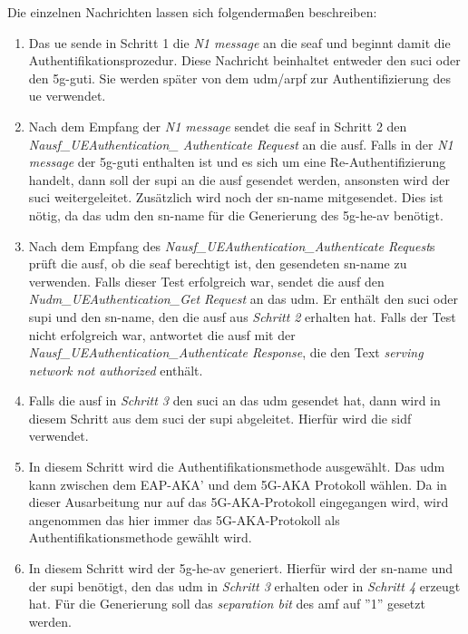 Die einzelnen Nachrichten lassen sich folgendermaßen beschreiben: %

\begin{enumerate}
\item Das \gls{ue} sende in Schritt 1 die \textit{N1 message} an die \gls{seaf} und beginnt damit die Authentifikationsprozedur.
Diese Nachricht beinhaltet entweder den \gls{suci} oder den \gls{5g-guti}.
Sie werden später von dem \gls{udm}/\gls{arpf} zur Authentifizierung des \gls{ue} verwendet.

\item Nach dem Empfang der \textit{N1 message} sendet die \gls{seaf} in Schritt 2 den \textit{Nausf\_UEAuthentication\_ Authenticate Request} an die \gls{ausf}.
Falls in der \textit{N1 message} der \gls{5g-guti} enthalten ist und es sich um eine Re-Authentifizierung handelt, dann soll der \gls{supi} an die \gls{ausf} gesendet werden, ansonsten wird der \gls{suci} weitergeleitet.
Zusätzlich wird noch der \gls{sn-name} mitgesendet.
Dies ist nötig, da das \gls{udm} den \gls{sn-name} für die Generierung des \gls{5g-he-av} benötigt.

\item Nach dem Empfang des \textit{Nausf\_UEAuthentication\_Authenticate Request}s prüft die \gls{ausf}, ob die \gls{seaf} berechtigt ist, den gesendeten \gls{sn-name} zu verwenden.
Falls dieser Test erfolgreich war, sendet die \gls{ausf} den \textit{Nudm\_UEAuthentication\_Get Request} an das \gls{udm}.
Er enthält den \gls{suci} oder \gls{supi} und den \gls{sn-name}, den die \gls{ausf} aus \textit{Schritt 2} erhalten hat.
Falls der Test nicht erfolgreich war, antwortet die \gls{ausf} mit der \textit{Nausf\_UEAuthentication\_Authenticate Response}, die den Text \textit{serving network not authorized} enthält.

\item Falls die \gls{ausf} in \textit{Schritt 3} den \gls{suci} an das \gls{udm} gesendet hat, dann wird in diesem Schritt aus dem \gls{suci} der \gls{supi} abgeleitet.
Hierfür wird die \gls{sidf} verwendet.

\item In diesem Schritt wird die Authentifikationsmethode ausgewählt.
Das \gls{udm} kann zwischen dem EAP-AKA' und dem 5G-AKA Protokoll wählen.
Da in dieser Ausarbeitung nur auf das 5G-AKA-Protokoll eingegangen wird, wird angenommen das hier immer das 5G-AKA-Protokoll als Authentifikationsmethode gewählt wird.

\item In diesem Schritt wird der \gls{5g-he-av} generiert.
Hierfür wird der \gls{sn-name} und der \gls{supi} benötigt, den das \gls{udm} in \textit{Schritt 3} erhalten oder in \textit{Schritt 4} erzeugt hat.
Für die Generierung soll das \textit{separation bit} des \gls{amf} auf ''1'' gesetzt werden.


\end{enumerate}
